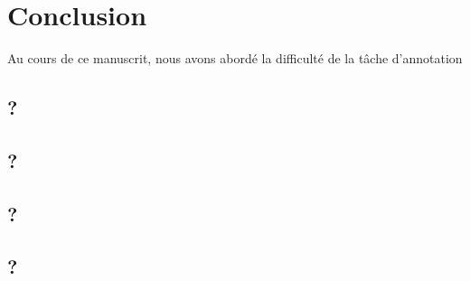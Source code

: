 \chapter{Conclusion}
\label{chapter:6-CONCLUSION}
	
	Au cours de ce manuscrit, nous avons abordé la difficulté de la tâche d'annotation 
	
	
	\section*{?}
	\label{section:6.1-CONCLUSION-}
	
	
	\section*{?}
	\label{section:6.2-CONCLUSION-}
	
	
	\section*{?}
	\label{section:6.3-CONCLUSION-}
	
	
	\section*{?}
	\label{section:6.4-CONCLUSION-}
